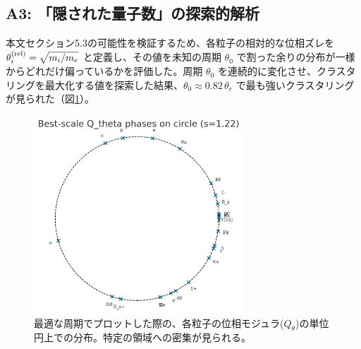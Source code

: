 \documentclass[11pt,a4paper,ja=standard]{ltjarticle}
\begin{document}
\subsection{A3: 「隠された量子数」の探索的解析}
本文セクション5.3の可能性を検証するため、各粒子の相対的な位相ズレを $\theta_i^{\rm(rel)}=\sqrt{m_i/m_e}$ と定義し、その値を未知の周期 $\theta_0$ で割った余りの分布が一様からどれだけ偏っているかを評価した。周期 $\theta_0$ を連続的に変化させ、クラスタリングを最大化する値を探索した結果、$\theta_0 \approx 0.82\,\theta_e$ で最も強いクラスタリングが見られた（図\ref{fig:hidden_quantum_number}）。
\begin{figure}[h!]
    \centering
    \includegraphics[width=0.7\textwidth]{A3_plot.png}
    \caption{最適な周期でプロットした際の、各粒子の位相モジュラ($Q_\theta$)の単位円上での分布。特定の領域への密集が見られる。}
    \label{fig:hidden_quantum_number}
\end{figure}
\end{document}
